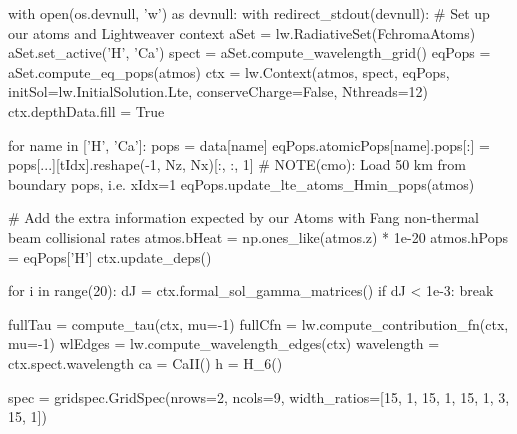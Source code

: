 \begin{pycode}[2DRT]
    with open(os.devnull, 'w') as devnull:
        with redirect_stdout(devnull):
            # Set up our atoms and Lightweaver context
            aSet = lw.RadiativeSet(FchromaAtoms)
            aSet.set_active('H', 'Ca')
            spect = aSet.compute_wavelength_grid()
            eqPops = aSet.compute_eq_pops(atmos)
            ctx = lw.Context(atmos, spect, eqPops, initSol=lw.InitialSolution.Lte, conserveCharge=False,
                            Nthreads=12)
            ctx.depthData.fill = True

            for name in ['H', 'Ca']:
                pops = data[name]
                eqPops.atomicPops[name].pops[:] = pops[...][tIdx].reshape(-1, Nz, Nx)[:, :, 1] # NOTE(cmo): Load 50 km from boundary pops, i.e. xIdx=1
            eqPops.update_lte_atoms_Hmin_pops(atmos)

            # Add the extra information expected by our Atoms with Fang non-thermal beam collisional rates
            atmos.bHeat = np.ones_like(atmos.z) * 1e-20
            atmos.hPops = eqPops['H']
            ctx.update_deps()

            for i in range(20):
                dJ = ctx.formal_sol_gamma_matrices()
                if dJ < 1e-3:
                    break

    fullTau = compute_tau(ctx, mu=-1)
    fullCfn = lw.compute_contribution_fn(ctx, mu=-1)
    wlEdges = lw.compute_wavelength_edges(ctx)
    wavelength = ctx.spect.wavelength
    ca = CaII()
    h = H_6()

    spec = gridspec.GridSpec(nrows=2, ncols=9, width_ratios=[15, 1, 15, 1, 15, 1, 3, 15, 1])


\end{pycode}
